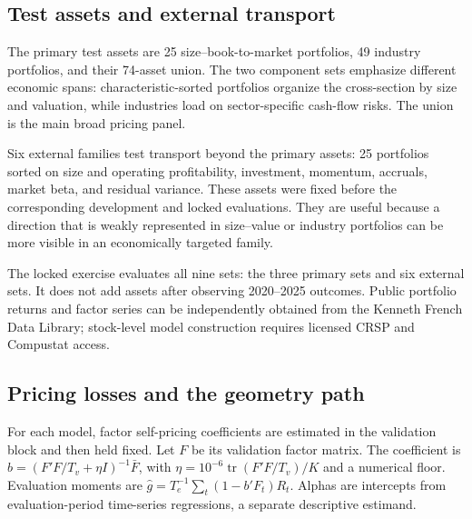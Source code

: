\subsection{Test assets and external transport}

The primary test assets are 25 size--book-to-market portfolios, 49 industry portfolios, and their 74-asset union. The two component sets emphasize different economic spans: characteristic-sorted portfolios organize the cross-section by size and valuation, while industries load on sector-specific cash-flow risks. The union is the main broad pricing panel.

Six external families test transport beyond the primary assets: 25 portfolios sorted on size and operating profitability, investment, momentum, accruals, market beta, and residual variance. These assets were fixed before the corresponding development and locked evaluations. They are useful because a direction that is weakly represented in size--value or industry portfolios can be more visible in an economically targeted family.

The locked exercise evaluates all nine sets: the three primary sets and six external sets. It does not add assets after observing 2020--2025 outcomes. Public portfolio returns and factor series can be independently obtained from the Kenneth French Data Library; stock-level model construction requires licensed CRSP and Compustat access.

\subsection{Pricing losses and the geometry path}

For each model, factor self-pricing coefficients are estimated in the validation block and then held fixed. Let $F$ be its validation factor matrix. The coefficient is $b=(F'F/T_v+\eta I)^{-1}\bar F$, with $\eta=10^{-6}\operatorname{tr}(F'F/T_v)/K$ and a numerical floor. Evaluation moments are $\hat g=T_e^{-1}\sum_t(1-b'F_t)R_t$. Alphas are intercepts from evaluation-period time-series regressions, a separate descriptive estimand.

